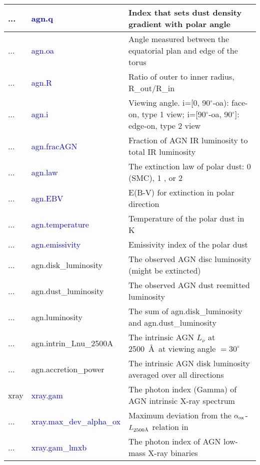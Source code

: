 \begin{longtable}{| p{} | p{} | p{} |}
...         & \textcolor{blue}{agn.q}           & Index that sets dust density gradient with polar angle \\ \hline
...         & \textcolor{blue}{agn.oa}          & Angle measured between the equatorial plan and edge of the torus \\ \hline
...         & \textcolor{blue}{agn.R}           & Ratio of outer to inner radius, R\_out/R\_in \\ \hline
...         & \textcolor{blue}{agn.i}           & Viewing angle. i=[0, 90$^\circ$-oa): face-on, type 1 view; i=[90$^\circ$-oa, 90$^\circ$]: edge-on, type 2 view \\ \hline
...         & \textcolor{blue}{agn.fracAGN}     & Fraction of AGN IR luminosity to total IR luminosity \\ \hline
...         & \textcolor{blue}{agn.law}         & The extinction law of polar dust: 0 (SMC), 1 \cite{calzetti00}, or 2 \cite{gaskell04} \\ \hline
...         & \textcolor{blue}{agn.EBV}         & E(B-V) for extinction in polar direction \\ \hline
...         & \textcolor{blue}{agn.temperature} & Temperature of the polar dust in K \\ \hline
...         & \textcolor{blue}{agn.emissivity}  & Emissivity index of the polar dust \\ \hline
...         & agn.disk\_luminosity              & The observed AGN disc luminosity (might be extincted) \\ \hline
...         & agn.dust\_luminosity              & The observed AGN dust reemitted luminosity \\ \hline
...         & agn.luminosity                    & The sum of agn.disk\_luminosity and agn.dust\_luminosity \\ \hline
...         & agn.intrin\_Lnu\_2500A            & The intrinsic AGN $L_\nu$ at 2500~\AA\ at viewing angle $=30^\circ$ \\ \hline
...         & agn.accretion\_power              & The intrinsic AGN disk luminosity averaged over all directions \\ \hline
xray & \textcolor{blue}{xray.gam}                 & The photon index (Gamma) of AGN intrinsic X-ray spectrum \\ \hline
...  & \textcolor{blue}{xray.max\_dev\_alpha\_ox} & Maximum deviation from the $\alpha_{\rm ox}$-$L_{2500 \textup{\AA}}$ relation in \cite{just07} \\ \hline
...  & \textcolor{blue}{xray.gam\_lmxb}           & The photon index of AGN low-mass X-ray binaries \\ \hline

\end{longtable}

